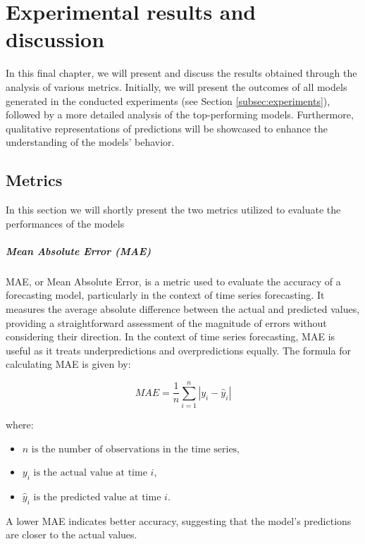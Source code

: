 \chapter{Experimental results and discussion}
\label{chap:results}

In this final chapter, we will present and discuss the results obtained through the analysis of various metrics. Initially, we will present the outcomes of all models generated in the conducted experiments (see Section \ref{subsec:experiments}), followed by a more detailed analysis of the top-performing models. 
Furthermore, qualitative representations of predictions will be showcased to enhance the understanding of the models' behavior.

\section{Metrics}

In this section we will shortly present the two metrics utilized to evaluate the performances of the models

\paragraph{Mean Absolute Error (MAE)}
MAE, or Mean Absolute Error, is a metric used to evaluate the accuracy of a forecasting model, particularly in the context of time series forecasting. It measures the average absolute difference between the actual and predicted values, providing a straightforward assessment of the magnitude of errors without considering their direction. In the context of time series forecasting, MAE is useful as it treats underpredictions and overpredictions equally. The formula for calculating MAE is given by:

\[
MAE = \frac{1}{n} \sum_{i=1}^{n} |y_i - \hat{y}_i|
\]

where:
\begin{itemize}[noitemsep, leftmargin=*]
\item[] $n \text{ is the number of observations in the time series,}$
\item[] $y_i \text{ is the actual value at time } i$, 
\item[] $\hat{y}_i \text{ is the predicted value at time } i$.
\end{itemize}

A lower MAE indicates better accuracy, suggesting that the model's predictions are closer to the actual values.

